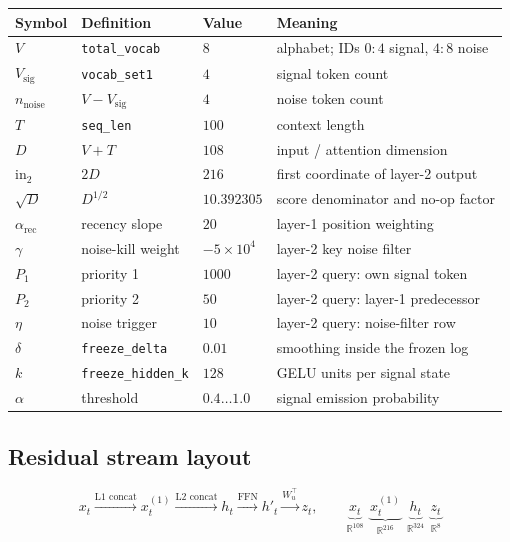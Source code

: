 \documentclass[11pt]{article}
\newcommand{\R}{\mathbb{R}}
\newcommand{\sd}{\sqrt{D}}
\begin{document}
\begin{center}
\begin{tabular}{@{}llll@{}}
\toprule
\textbf{Symbol} & \textbf{Definition} & \textbf{Value} & \textbf{Meaning}\\
\midrule
$V$        & \texttt{total\_vocab}  & $8$ & alphabet; IDs $0{:}4$ signal, $4{:}8$ noise\\
$V_{\mathrm{sig}}$ & \texttt{vocab\_set1} & $4$ & signal token count\\
$n_{\mathrm{noise}}$ & $V-V_{\mathrm{sig}}$ & $4$ & noise token count\\
$T$        & \texttt{seq\_len}      & $100$ & context length\\
$D$        & $V+T$                  & $108$ & input / attention dimension\\
$\mathrm{in}_2$ & $2D$              & $216$ & first coordinate of layer-2 output\\
$\sd$      & $D^{1/2}$              & $10.392305$ & score denominator and no-op factor\\
$\alpha_{\mathrm{rec}}$ & recency slope & $20$ & layer-1 position weighting\\
$\gamma$   & noise-kill weight      & $-5\times10^4$ & layer-2 key noise filter\\
$P_1$      & priority 1             & $1000$ & layer-2 query: own signal token\\
$P_2$      & priority 2             & $50$ & layer-2 query: layer-1 predecessor\\
$\eta$     & noise trigger          & $10$ & layer-2 query: noise-filter row\\
$\delta$   & \texttt{freeze\_delta} & $0.01$ & smoothing inside the frozen log\\
$k$        & \texttt{freeze\_hidden\_k} & $128$ & GELU units per signal state\\
$\alpha$   & threshold              & $0.4\ldots1.0$ & signal emission probability\\
\bottomrule
\end{tabular}
\end{center}

\subsection{Residual stream layout}

\[
x_t \xrightarrow{\text{L1 concat}} x^{(1)}_t \xrightarrow{\text{L2 concat}} h_t
\xrightarrow{\text{FFN}} h'_t \xrightarrow{W_u^\top} z_t,
\qquad
\underbrace{x_t}_{\R^{108}}\ \
\underbrace{x^{(1)}_t}_{\R^{216}}\ \
\underbrace{h_t}_{\R^{324}}\ \
\underbrace{z_t}_{\R^{8}}
\]
\end{document}
